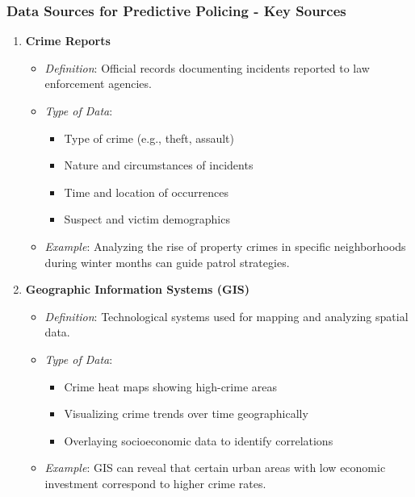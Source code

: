 \documentclass[aspectratio=169]{beamer}
\begin{document}
\begin{frame}[fragile]
    \frametitle{Data Sources for Predictive Policing - Key Sources}
    \begin{enumerate}
        \item \textbf{Crime Reports}
        \begin{itemize}
            \item \textit{Definition}: Official records documenting incidents reported to law enforcement agencies.
            \item \textit{Type of Data}:
            \begin{itemize}
                \item Type of crime (e.g., theft, assault)
                \item Nature and circumstances of incidents
                \item Time and location of occurrences
                \item Suspect and victim demographics
            \end{itemize}
            \item \textit{Example}: Analyzing the rise of property crimes in specific neighborhoods during winter months can guide patrol strategies.
        \end{itemize}

        \item \textbf{Geographic Information Systems (GIS)}
        \begin{itemize}
            \item \textit{Definition}: Technological systems used for mapping and analyzing spatial data.
            \item \textit{Type of Data}:
            \begin{itemize}
                \item Crime heat maps showing high-crime areas
                \item Visualizing crime trends over time geographically
                \item Overlaying socioeconomic data to identify correlations
            \end{itemize}
            \item \textit{Example}: GIS can reveal that certain urban areas with low economic investment correspond to higher crime rates.
        \end{itemize}
    \end{enumerate}
\end{frame}
\end{document}
